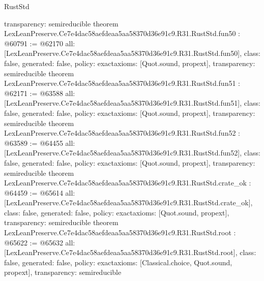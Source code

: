 \begin{lexlean}{RustStd}
\begin{coremodule}
{  transparency: semireducible
}
theorem LexLeanPreserve.Ce7e4dac58aefdeaa5aa58370d36e91c9.R31.RustStd.fun50 : @60791 := @62170 {
  all: [LexLeanPreserve.Ce7e4dac58aefdeaa5aa58370d36e91c9.R31.RustStd.fun50],
  class: false,
  generated: false,
  policy: exact{axioms: [Quot.sound, propext]},
  transparency: semireducible
}
theorem LexLeanPreserve.Ce7e4dac58aefdeaa5aa58370d36e91c9.R31.RustStd.fun51 : @62171 := @63588 {
  all: [LexLeanPreserve.Ce7e4dac58aefdeaa5aa58370d36e91c9.R31.RustStd.fun51],
  class: false,
  generated: false,
  policy: exact{axioms: [Quot.sound, propext]},
  transparency: semireducible
}
theorem LexLeanPreserve.Ce7e4dac58aefdeaa5aa58370d36e91c9.R31.RustStd.fun52 : @63589 := @64455 {
  all: [LexLeanPreserve.Ce7e4dac58aefdeaa5aa58370d36e91c9.R31.RustStd.fun52],
  class: false,
  generated: false,
  policy: exact{axioms: [Quot.sound, propext]},
  transparency: semireducible
}
theorem LexLeanPreserve.Ce7e4dac58aefdeaa5aa58370d36e91c9.R31.RustStd.crate_ok : @64459 := @65614 {
  all: [LexLeanPreserve.Ce7e4dac58aefdeaa5aa58370d36e91c9.R31.RustStd.crate_ok],
  class: false,
  generated: false,
  policy: exact{axioms: [Quot.sound, propext]},
  transparency: semireducible
}
theorem LexLeanPreserve.Ce7e4dac58aefdeaa5aa58370d36e91c9.R31.RustStd.root : @65622 := @65632 {
  all: [LexLeanPreserve.Ce7e4dac58aefdeaa5aa58370d36e91c9.R31.RustStd.root],
  class: false,
  generated: false,
  policy: exact{axioms: [Classical.choice, Quot.sound, propext]},
  transparency: semireducible
}


\end{coremodule}
\end{lexlean}
